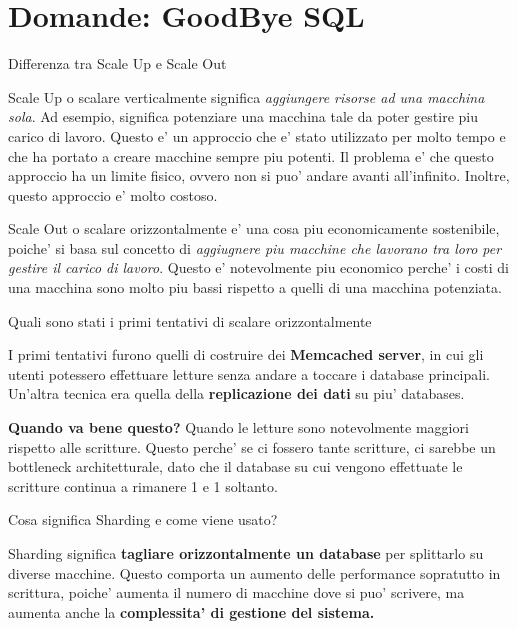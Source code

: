 \section{Domande: GoodBye SQL}
\begin{domanda}
    Differenza tra Scale Up e Scale Out
\end{domanda}

Scale Up o scalare verticalmente significa \textit{aggiungere risorse ad una
    macchina sola}. Ad esempio, significa potenziare una macchina tale da poter
gestire piu carico di lavoro. Questo e' un approccio che e' stato utilizzato
per molto tempo e che ha portato a creare macchine sempre piu potenti. Il
problema e' che questo approccio ha un limite fisico, ovvero non si puo' andare
avanti all'infinito. Inoltre, questo approccio e' molto costoso.

Scale Out o scalare orizzontalmente e' una cosa piu economicamente sostenibile,
poiche' si basa sul concetto di \textit{aggiugnere piu macchine che lavorano
    tra loro per gestire il carico di lavoro}. Questo e' notevolmente piu economico
perche' i costi di una macchina sono molto piu bassi rispetto a quelli di una
macchina potenziata.

\begin{domanda}
    Quali sono stati i primi tentativi di scalare orizzontalmente
\end{domanda}

I primi tentativi furono quelli di costruire dei \textbf{Memcached server}, in
cui gli utenti potessero effettuare letture senza andare a toccare i database
principali. Un'altra tecnica era quella della \textbf{replicazione dei dati} su
piu' databases.

\textbf{Quando va bene questo?} Quando le letture sono notevolmente maggiori rispetto alle scritture.
Questo perche' se ci fossero tante scritture, ci sarebbe un bottleneck architetturale, dato che
il database su cui vengono effettuate le scritture continua a rimanere 1 e 1 soltanto.

\begin{domanda}
    Cosa significa Sharding e come viene usato?
\end{domanda}

Sharding significa \textbf{tagliare orizzontalmente un database} per splittarlo
su diverse macchine. Questo comporta un aumento delle performance sopratutto in
scrittura, poiche' aumenta il numero di macchine dove si puo' scrivere, ma
aumenta anche la \textbf{complessita' di gestione del sistema.}

